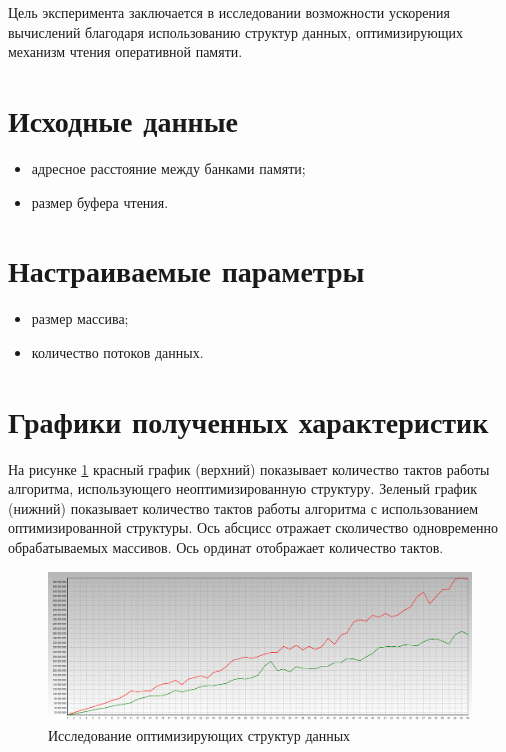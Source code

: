 Цель эксперимента заключается в исследовании возможности ускорения вычислений благодаря использованию структур данных, оптимизирующих механизм чтения оперативной памяти.

\section{Исходные данные}

\begin{itemize}
	\item адресное расстояние между банками памяти;
	\item размер буфера чтения.
\end{itemize}

\section{Настраиваемые параметры}

\begin{itemize}
	\item размер массива;
	\item количество потоков данных.
\end{itemize}

\section{Графики полученных характеристик}

На рисунке \ref{img:read} красный график (верхний) показывает количество тактов работы алгоритма, использующего неоптимизированную структуру. Зеленый график (нижний) показывает количество тактов работы алгоритма с использованием оптимизированной структуры. Ось абсцисс отражает сколичество одновременно обрабатываемых массивов. Ось ординат отображает количество тактов.

\begin{figure}[H]
	\begin{center}
		\includegraphics[scale=0.2]{img/lab_03_04.jpg}
	\end{center}
	\captionsetup{justification=centering}
	\caption{Исследование оптимизирующих структур данных}
	\label{img:read}
\end{figure}

